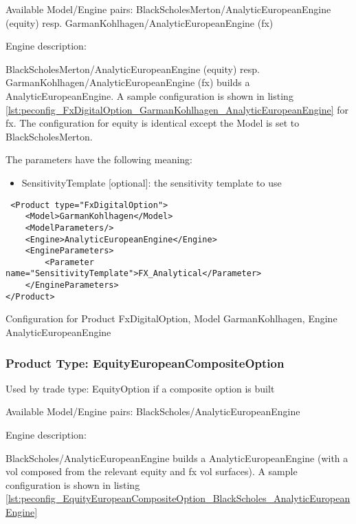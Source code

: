 Available Model/Engine pairs: BlackScholesMerton/AnalyticEuropeanEngine (equity)
resp. GarmanKohlhagen/AnalyticEuropeanEngine (fx)

Engine description:

BlackScholesMerton/AnalyticEuropeanEngine (equity) resp. GarmanKohlhagen/AnalyticEuropeanEngine (fx) builds a
AnalyticEuropeanEngine. A sample configuration is shown in listing
\ref{lst:peconfig_FxDigitalOption_GarmanKohlhagen_AnalyticEuropeanEngine} for fx. The configuration for equity is
identical except the Model is set to BlackScholesMerton.

The parameters have the following meaning:

\begin{itemize}
\item SensitivityTemplate [optional]: the sensitivity template to use 
\end{itemize}

\begin{longlisting}
\begin{verbatim}
 <Product type="FxDigitalOption">
    <Model>GarmanKohlhagen</Model>
    <ModelParameters/>
    <Engine>AnalyticEuropeanEngine</Engine>
    <EngineParameters>
        <Parameter name="SensitivityTemplate">FX_Analytical</Parameter>
    </EngineParameters>
</Product>
\end{verbatim}
\caption{Configuration for Product FxDigitalOption, Model GarmanKohlhagen, Engine AnalyticEuropeanEngine}
\label{lst:peconfig_FxDigitalOption_GarmanKohlhagen_AnalyticEuropeanEngine}
\end{longlisting}

\subsubsection{Product Type: EquityEuropeanCompositeOption}

Used by trade type: EquityOption if a composite option is built

Available Model/Engine pairs: BlackScholes/AnalyticEuropeanEngine

Engine description:

BlackScholes/AnalyticEuropeanEngine builds a AnalyticEuropeanEngine (with a vol composed from the relevant equity and fx
vol surfaces). A sample configuration is shown in listing
\ref{lst:peconfig_EquityEuropeanCompositeOption_BlackScholes_AnalyticEuropeanEngine}

